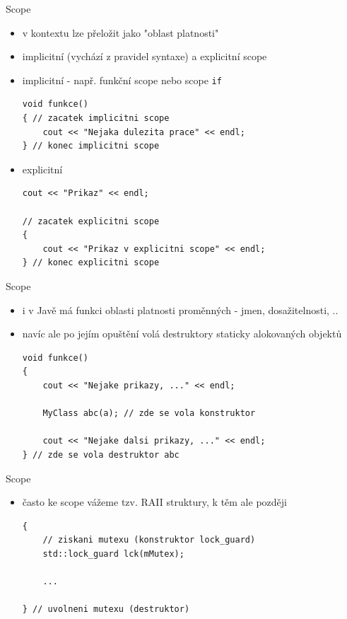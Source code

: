 \documentclass{beamer}
\begin{document}
\begin{xframe}{Scope}
	\begin{itemize}
		\item v kontextu lze přeložit jako "oblast platnosti"
		\item implicitní (vychází z pravidel syntaxe) a explicitní scope
		\item implicitní - např. funkční scope nebo scope \texttt{if}
\begin{lstlisting}[basicstyle=\fontsize{9}{10}\selectfont\ttfamily]
void funkce()
{ // zacatek implicitni scope
    cout << "Nejaka dulezita prace" << endl;
} // konec implicitni scope
\end{lstlisting}
		\item explicitní
\begin{lstlisting}[basicstyle=\fontsize{9}{10}\selectfont\ttfamily]
cout << "Prikaz" << endl;

// zacatek explicitni scope
{
    cout << "Prikaz v explicitni scope" << endl;
} // konec explicitni scope
\end{lstlisting}

	\end{itemize}
\end{xframe}


\begin{xframe}{Scope}
	\begin{itemize}
		\item i v Javě má funkci oblasti platnosti proměnných - jmen, dosažitelnosti, ..
		\item navíc ale po jejím opuštění volá destruktory staticky alokovaných objektů
		
\begin{lstlisting}[basicstyle=\fontsize{9}{10}\selectfont\ttfamily]
void funkce()
{
    cout << "Nejake prikazy, ..." << endl;
    
    MyClass abc(a); // zde se vola konstruktor
    
    cout << "Nejake dalsi prikazy, ..." << endl;
} // zde se vola destruktor abc
\end{lstlisting}
	\end{itemize}
\end{xframe}


\begin{xframe}{Scope}
	\begin{itemize}
		\item často ke scope vážeme tzv. RAII struktury, k těm ale později
		
\begin{lstlisting}[basicstyle=\fontsize{9}{10}\selectfont\ttfamily]
{
    // ziskani mutexu (konstruktor lock_guard)
    std::lock_guard lck(mMutex);

    ...

} // uvolneni mutexu (destruktor)
\end{lstlisting}
	\end{itemize}
\end{xframe}
\end{document}
